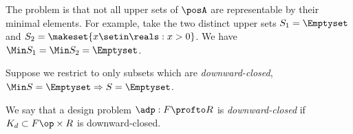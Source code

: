 The problem is that not all upper sets of $\posA$ are representable by their minimal elements.
For example, take the two distinct upper sets $S_1 = \Emptyset$ and $S_2 = \makeset{x \setin \reals : x > 0}$.
We have $\Min S_1 = \Min S_2 = \Emptyset$.

Suppose we restrict to only subsets which are \emph{downward-closed}, \ie  $\Min S = \Emptyset \Rightarrow S = \Emptyset$.





We say that a design problem $\adp : F \profto R$ is \emph{downward-closed} if $K_d \subset F\op \times R$ is downward-closed.


